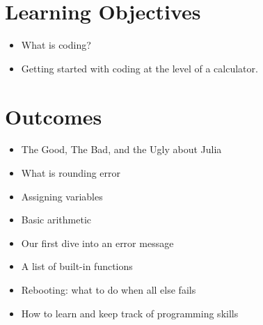 
\section*{Learning Objectives}

\begin{itemize}
\item What is coding?
\item Getting started with coding at the level of a calculator.
\end{itemize}

\section*{Outcomes} 
\begin{itemize}
\item The Good, The Bad, and the Ugly about Julia
\item What is rounding error
\item Assigning variables
\item Basic arithmetic 
\item Our first dive into an error message
\item A list of built-in functions
\item Rebooting: what to do when all else fails
\item How to learn and keep track of programming skills
\end{itemize}


\newpage

